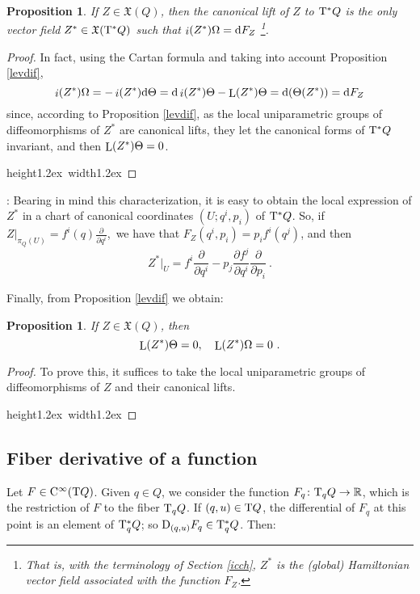 \documentclass[12pt]{report}
\newtheorem{prop}[teor]{Proposition}
\def\beq{\begin{equation}}
\def\eeq{\end{equation}}
\def\derpar#1#2{\frac{\partial{#1}}{\partial{#2}}}
\def\qed{\ifvmode\removelastskip\fi
{\unskip\nobreak\hfil\penalty50\hbox{}\nobreak\hfil
\hbox{\vrule height1.2ex width1.2ex}\parfillskip=0pt
\finalhyphendemerits=0 \par\smallskip}}
\def\vf{\mathfrak X}
\def\d{{\rm d}}
\def\Real{\mathbb{R}}
\def\Tan{{\rm T}}
\def\Lie{\mathop{\rm L}\nolimits}
\def\inn{\mathop{i}\nolimits}
\def\Cinfty{{\rm C}^\infty}
\begin{document}
\begin{prop}
If $Z\in\vf (Q)$, then the canonical lift of $Z$ to $\Tan^*Q$
is the only vector field $Z^*\in\vf (\Tan^*Q)$ such that
$\inn (Z^*)\Omega =\d F_Z$
\footnote{
That is, with the terminology of Section \ref{icch},
$Z^*$ is the  (global) Hamiltonian vector field associated with the function $F_Z$.}.
\label{hamlev}
\end{prop}
\begin{proof}
In fact, using the Cartan formula and taking into account Proposition \ref{levdif},
$$
\inn (Z^*)\Omega =-\inn (Z^*)\d\Theta =
\d\inn (Z^*)\Theta -\Lie (Z^*)\Theta =\d (\Theta (Z^*))=\d F_Z
$$
since, according to Proposition \ref{levdif},
as the local uniparametric groups of diffeomorphisms of $Z^*$
are canonical lifts, 
they let  the canonical forms of $\Tan^*Q$ invariant, and then
$\Lie (Z^*)\Theta =0$.
\\ \qed \end{proof}

:
Bearing in mind this characterization, it is easy to obtain the local expression
of $Z^*$ in a chart of canonical coordinates 
$(U;q^i,p_i)$ of $\Tan^*Q$. So, if
\ $\displaystyle Z\vert_{\pi_Q (U)}=f^i(q)\derpar{}{q^i}$,\
we have that $F_Z(q^i,p_i)=p_if^i(q^j)$, and then
\beq
Z^*\vert_U=f^i\derpar{}{q^i}-p_j\derpar{f^j}{q^i}\derpar{}{p_i} \ .
\label{canlifcot}
\eeq

Finally, from Proposition \ref{levdif} we obtain:

\begin{prop}
If $Z\in\vf (Q)$, then
$$
\Lie(Z^*)\Theta=0 ,\quad
\Lie(Z^*)\Omega=0 \ .
$$
\label{inf}
\end{prop}
\begin{proof}
To prove this, it suffices to take the local uniparametric groups of diffeomorphisms 
of $Z$ and their canonical lifts.
\\ \qed \end{proof}


\subsection{Fiber derivative of a function}


Let $F\in\Cinfty(\Tan Q)$.
Given $q \in Q$, we consider the function $F_q \colon \Tan_qQ \to \Real$, 
which is the restriction of $F$ to the fiber $\Tan_qQ$.
If $(q,u)\in \Tan Q$, the differential of $F_q$ at this point
is an element of $\Tan_q^*Q$; so ${\rm D}_{(q,u)}F_q \in \Tan^*_qQ$. Then:
\end{document}
